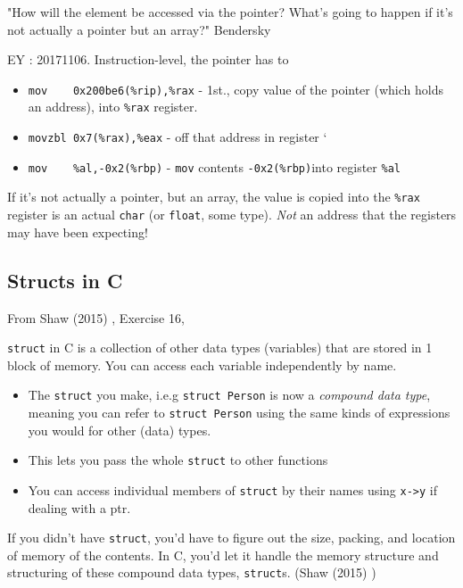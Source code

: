 \documentclass[10pt]{amsart}
\begin{document}
"How will the element be accessed via the pointer?  What's going to happen if it's not actually a pointer but an array?"  Bendersky \cite{Bend}   

EY : 20171106.  Instruction-level, the pointer has to     
\begin{itemize}
	\item \verb|mov    0x200be6(%rip),%rax| - 1st., copy value of the pointer (which holds an address), into \verb|%rax| register.  
	\item \verb|movzbl 0x7(%rax),%eax| - off that address in register `%
	\item \verb|mov    %al,-0x2(%rbp)| - \verb|mov| contents \verb|-0x2(%rbp)|into register \verb|%al|
\end{itemize}

If it's not actually a pointer, but an array, the value is copied into the \verb|%rax| register is an actual \verb|char| (or \verb|float|, some type).  \emph{Not} an address that the registers may have been expecting!  


\subsection{Structs in C}
From Shaw (2015) \cite{Shaw2015}, Exercise 16, 

\verb|struct| in C is a collection of other data types (variables) that are stored in 1 block of memory.  You can access each variable independently by name.  

\begin{itemize}
	\item The \verb|struct| you make, i.e.g \verb|struct Person| is now a \emph{compound data type}, meaning you can refer to \verb|struct Person| using the same kinds of expressions you would for other (data) types.
	\item This lets you pass the whole \verb|struct| to other functions
	\item You can access individual members of \verb|struct| by their names using \verb|x->y| if dealing with a ptr.  
\end{itemize}  

If you didn't have \verb|struct|, you'd have to figure out the size, packing, and location of memory of the contents.  In C, you'd let it handle the memory structure and structuring of these compound data types, \verb|struct|s.  (Shaw (2015) \cite{Shaw2015})
\end{document}
